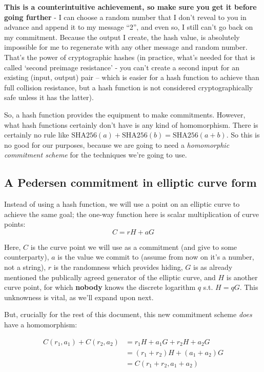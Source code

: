 \documentclass[10pt,a4paper]{article}
\begin{document}
\textbf{This is a counterintuitive achievement, so make sure you get it before going further }- I can choose a random number that I don't reveal to you in advance and append it to my message ``2'', and even so, I still can't go back on my commitment. Because the output I create, the
hash value, is absolutely impossible for me to regenerate with any other message and random
number. That's the power of cryptographic hashes (in practice, what's needed for that is called
`second preimage resistance' - you can't create a second input for an existing (input, output) pair -- which is easier for a hash function to achieve than full collision resistance, but a hash function is not considered cryptographically safe unless it has the latter).

So, a hash function provides the equipment to make commitments. However, what hash functions certainly don't have is any kind of homomorphism. There is certainly no rule like $\textrm{SHA256}(a) + \textrm{SHA256}(b) = \textrm{SHA256}(a+b)$. So this is no good for our purposes, because we are going to need a \emph{homomorphic commitment scheme} for the techniques we're going to use.

\hypertarget{a-pedersen-commitment-in-elliptic-curve-form}{%
\subsection[A Pedersen commitment in elliptic curve
form]{\texorpdfstring{\protect\hypertarget{anchor-15}{}{}A Pedersen
commitment in elliptic curve
form}{A Pedersen commitment in elliptic curve form}}\label{a-pedersen-commitment-in-elliptic-curve-form}}

Instead of using a hash function, we will use a point on an elliptic
curve to achieve the same goal; the one-way function here is scalar
multiplication of curve points:
\[C = rH + aG \]

Here, $C$ is the curve point we will use as a commitment (and give to some
counterparty), $a$ is the value we commit to (assume from now on it's a
number, not a string), $r$ is the randomness which provides hiding, $G$ is as
already mentioned the publically agreed generator of the elliptic curve,
and $H$ is another curve point, for which \textbf{nobody} knows the discrete
logarithm $q$ s.t. $H=qG$. This unknowness is vital, as we'll expand upon next.

But, crucially for the rest of this document, this new commitment scheme
\emph{does} have a homomorphism:

\begin{align*}
C(r_1, a_1) + C(r_2, a_2) & = r_1H + a_1G + r_2H + a_2G  \\
                          & = (r_1 + r_2)H + (a_1 + a_2)G \\
                          & = C(r_1+r_2, a_1+a_2)
\end{align*}
\end{document}
